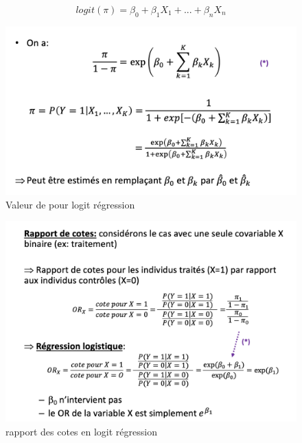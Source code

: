 $$ logit(\pi) = \beta_{0}+\beta_{1}X_{1}+...+\beta_{n}X_{n}$$

\begin{figure}[H]
    \centering
    \includegraphics[scale=0.5]{images/pi_logit.png}
    \caption{Valeur de \pi pour logit régression}
    \label{fig:my_label}
\end{figure}

\begin{figure}[H]
    \centering
    \includegraphics[scale=0.5]{images/rapportcote_logit.png}
    \caption{rapport des cotes en logit régression}
    \label{fig:my_label}
\end{figure}

